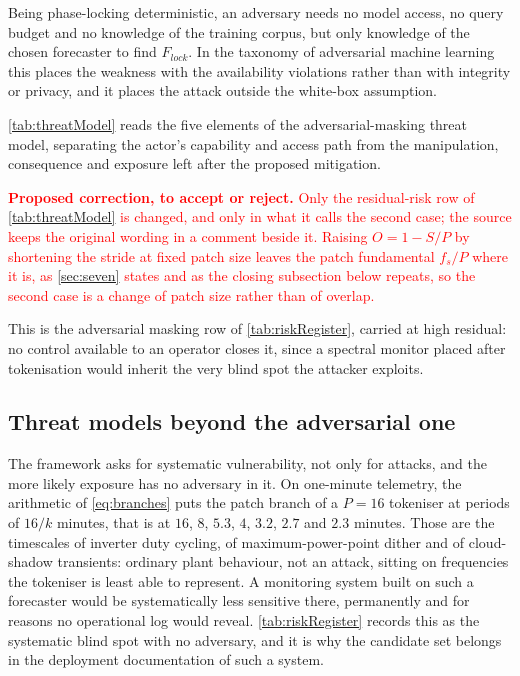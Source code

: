 Being phase-locking deterministic, an adversary needs no model access, no query budget and no knowledge of the training corpus, but only knowledge of the chosen forecaster to find $F_{lock}$. In the taxonomy of adversarial machine learning\autocite{vassilevAdversarialMachineLearning2024} this places the weakness with the availability violations rather than with integrity or privacy, and it places the attack outside the white-box assumption.

\autoref{tab:threatModel} reads the five elements of the adversarial-masking threat model\autocite{vassilevAdversarialMachineLearning2024}, separating the actor's capability and access path from the manipulation, consequence and exposure left after the proposed mitigation.



\textcolor{red}{\textbf{Proposed correction, to accept or reject.} Only the residual-risk row of \autoref{tab:threatModel} is changed, and only in what it calls the second case; the source keeps the original wording in a comment beside it. Raising $O=1-S/P$ by shortening the stride at fixed patch size leaves the patch fundamental $f_s/P$ where it is, as \autoref{sec:seven} states and as the closing subsection below repeats, so the second case is a change of patch size rather than of overlap.}

This is the adversarial masking row of \autoref{tab:riskRegister}, carried at high residual: no control available to an operator closes it, since a spectral monitor placed after tokenisation would inherit the very blind spot the attacker exploits.

\subsection{Threat models beyond the adversarial one}

The framework asks for systematic vulnerability, not only for attacks, and the more likely exposure has no adversary in it. On one-minute telemetry, the arithmetic of \autoref{eq:branches} puts the patch branch of a $P{=}16$ tokeniser at periods of $16/k$ minutes, that is at $16$, $8$, $5.3$, $4$, $3.2$, $2.7$ and $2.3$ minutes. Those are the timescales of inverter duty cycling, of maximum-power-point dither and of cloud-shadow transients: ordinary plant behaviour, not an attack, sitting on frequencies the tokeniser is least able to represent. A monitoring system built on such a forecaster would be systematically less sensitive there, permanently and for reasons no operational log would reveal. \autoref{tab:riskRegister} records this as the systematic blind spot with no adversary, and it is why the candidate set belongs in the deployment documentation of such a system.

